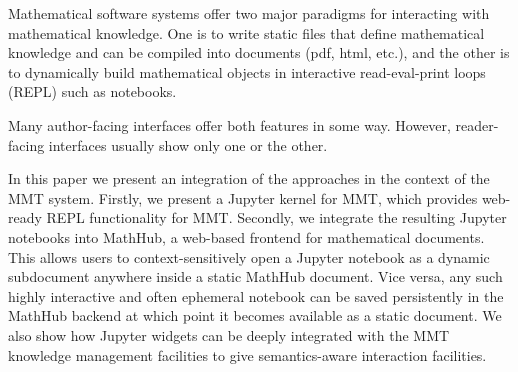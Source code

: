 Mathematical software systems offer two major paradigms for interacting with mathematical knowledge.
One is to write static files that define mathematical knowledge and can be compiled into documents (pdf, html, etc.), and the other is to dynamically build mathematical objects in interactive read-eval-print loops (REPL) such as notebooks.

Many author-facing interfaces offer both features in some way.
However, reader-facing interfaces usually show only one or the other.

In this paper we present an integration of the approaches in the context of the MMT system.
Firstly, we present a Jupyter kernel for MMT, which provides web-ready REPL functionality for MMT.
Secondly, we integrate the resulting Jupyter notebooks into MathHub, a web-based frontend for mathematical documents.
This allows users to context-sensitively open a Jupyter notebook as a dynamic subdocument anywhere inside a static MathHub document.
Vice versa, any such highly interactive and often ephemeral notebook can be saved persistently in the MathHub backend at which point it becomes available as a static document.
We also show how Jupyter widgets can be deeply integrated with the MMT knowledge management facilities to give semantics-aware interaction facilities.



